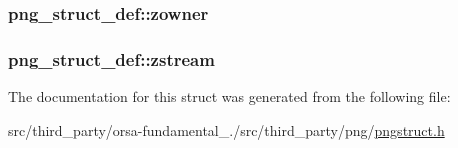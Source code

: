\subsubsection[{zowner}]{ png\+\_\+struct\+\_\+def\+::zowner}\label{structpng__struct__def_a5bfc727f45873680edacf4d12bebc8f4}
\hypertarget{structpng__struct__def_aed56a6997ce7d1a90f0a143eb0964cd5}{}
\subsubsection[{zstream}]{ png\+\_\+struct\+\_\+def\+::zstream}\label{structpng__struct__def_aed56a6997ce7d1a90f0a143eb0964cd5}


The documentation for this struct was generated from the following file\+:\begin{DoxyCompactItemize}
\item 
src/third\+\_\+party/orsa-\/fundamental\+\_./src/third\+\_\+party/png/\hyperlink{pngstruct_8h}{pngstruct.\+h}\end{DoxyCompactItemize}

